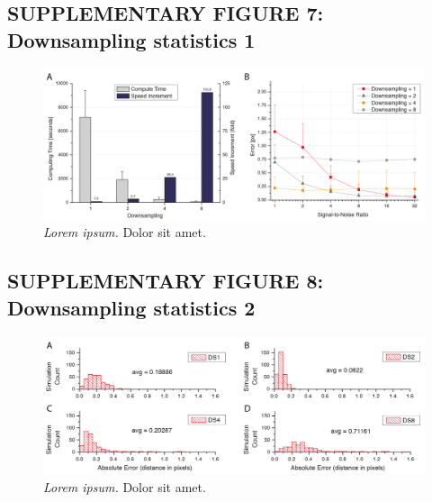 \documentclass[]{spie}  %
\begin{document}
\pagebreak

\subsection*{SUPPLEMENTARY FIGURE 7: Downsampling statistics 1}
\vspace{1mm}
\begin{figure}[h!]
\includegraphics[width=\textwidth]{fig-downsampling-statistics-0.png}
\vspace{-2.0mm}
\caption{\hspace{-0.5mm} \emph{Lorem ipsum.} Dolor sit amet.
}
\label{fig:sup-fig-downsampling-statistics-0}
\end{figure}

\pagebreak

\subsection*{SUPPLEMENTARY FIGURE 8: Downsampling statistics 2}
\vspace{1mm}
\begin{figure}[h!]
\includegraphics[width=\textwidth]{fig-downsampling-statistics-1.png}
\vspace{-2.0mm}
\caption{\hspace{-0.5mm} \emph{Lorem ipsum.} Dolor sit amet.
}
\label{fig:sup-fig-downsampling-statistics-1}
\end{figure}

\pagebreak
\end{document}
